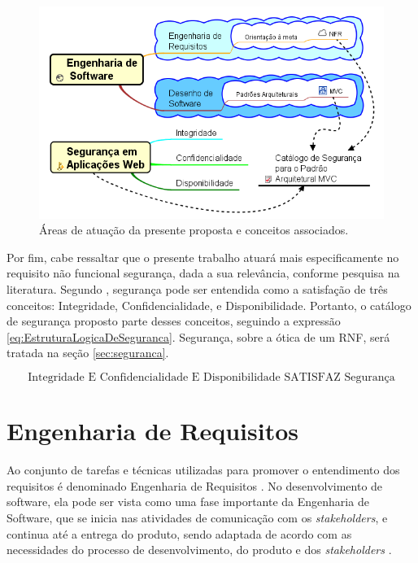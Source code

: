 \pagebreak

\begin{figure}[h!]
	\centering
	\includegraphics[keepaspectratio=true,scale=0.8]{figuras/bigPicture.png}
	\caption{Áreas de atuação  da presente proposta e conceitos associados.}
	\label{BigPicture}
\end{figure}

Por fim, cabe ressaltar que o presente trabalho atuará mais especificamente no requisito não funcional segurança, dada a sua relevância, conforme pesquisa na literatura. Segundo \cite{chung2012non}, segurança pode ser entendida como a satisfação de três conceitos: Integridade, Confidencialidade, e Disponibilidade. Portanto, o catálogo de segurança proposto parte desses conceitos, seguindo a expressão \ref{eq:EstruturaLogicaDeSeguranca}. Segurança, sobre a ótica de um RNF, será tratada na seção \ref{sec:seguranca}.

\begin{equation}
	\label{eq:EstruturaLogicaDeSeguranca}
	\textrm{Integridade E Confidencialidade E Disponibilidade SATISFAZ Segurança}
\end{equation}

\section{Engenharia de Requisitos}
\label{sec:requisitos}

Ao conjunto de tarefas e técnicas utilizadas para promover o entendimento dos requisitos é denominado Engenharia de Requisitos \cite{pressman2011engenharia}. No desenvolvimento de software, ela pode ser vista como uma fase importante da Engenharia de Software, que se inicia nas atividades de comunicação com os \textit{stakeholders}, e continua até a entrega do produto, sendo adaptada de acordo com as necessidades do processo de desenvolvimento, do produto e dos \textit{stakeholders} \cite{pressman2011engenharia}.

